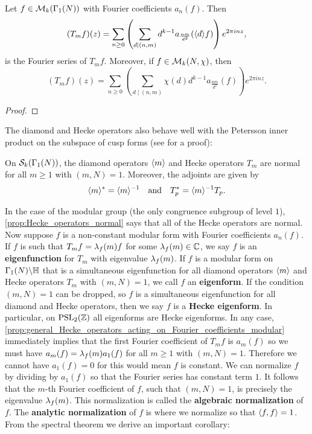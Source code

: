       \begin{proposition}\label{prop:general_Hecke_operators_acting_on_Fourier_coefficients_modular}
        Let $f \in \mathcal{M}_{k}(\Gamma_{1}(N))$ with Fourier coefficients $a_{n}(f)$. Then
        \[
          (T_{m}f)(z) = \sum_{n \ge 0}\left(\sum_{d \mid (n,m)}d^{k-1}a_{\frac{nm}{d^{2}}}(\langle d\rangle f)\right)e^{2\pi inz},
        \]
        is the Fourier series of $T_{m}f$. Moreover, if $f \in \mathcal{M}_{k}(N,\chi)$, then
        \[
          (T_{m}f)(z) = \sum_{n \ge 0}\left(\sum_{d \mid (n,m)}\chi(d)d^{k-1}a_{\frac{nm}{d^{2}}}(f)\right)e^{2\pi inz}.
        \]
      \end{proposition}
      \begin{proof}
      \end{proof}

      The diamond and Hecke operators also behave well with the Petersson inner product on the subspace of cusp forms (see \cite{lang1987introduction} for a proof):

      \begin{proposition}\label{prop:Hecke_operators_normal}
        On $\mathcal{S}_{k}(\Gamma_{1}(N))$, the diamond operators $\langle m\rangle$ and Hecke operators $T_{m}$ are normal for all $m \ge 1$ with $(m,N) = 1$. Moreover, the adjoints are given by
        \[
          \langle m\rangle^{\ast} = \langle m\rangle^{-1} \quad \text{and} \quad T_{p}^{\ast} = \langle m\rangle^{-1}T_{p}.
        \]
      \end{proposition}

      In the case of the modular group (the only congruence subgroup of level $1$), \cref{prop:Hecke_operators_normal} says that all of the Hecke operators are normal. Now suppose $f$ is a non-constant modular form with Fourier coefficients $a_{n}(f)$. If $f$ is such that $T_{m}f = \lambda_{f}(m)f$ for some $\lambda_{f}(m) \in \mathbb{C}$, we say $f$ is an \textbf{eigenfunction} for $T_{m}$ with eigenvalue $\lambda_{f}(m)$. If $f$ is a modular form on $\Gamma_{1}(N)\backslash\mathbb{H}$ that is a simultaneous eigenfunction for all diamond operators $\langle m\rangle$ and Hecke operators $T_{m}$ with $(m,N) = 1$, we call $f$ an \textbf{eigenform}. If the condition $(m,N) = 1$ can be dropped, so $f$ is a simultaneous eigenfunction for all diamond and Hecke operators, then we say $f$ is a \textbf{Hecke eigenform}. In particular, on $\mathrm{PSL}_{2}(\mathbb{Z})$ all eigenforms are Hecke eigenforms. In any case, \cref{prop:general_Hecke_operators_acting_on_Fourier_coefficients_modular} immediately implies that the first Fourier coefficient of $T_{m}f$ is $a_{m}(f)$ so we must have $a_{m}(f) = \lambda_{f}(m)a_{1}(f)$ for all $m \ge 1$ with $(m,N) = 1$. Therefore we cannot have $a_{1}(f) = 0$ for this would mean $f$ is constant. We can normalize $f$ by dividing by $a_{1}(f)$ so that the Fourier series has constant term $1$. It follows that the $m$-th Fourier coefficient of $f$, such that $(m,N) = 1$, is precisely the eigenvalue $\lambda_{f}(m)$. This normalization is called the \textbf{algebraic normalization} of $f$. The \textbf{analytic normalization} of $f$ is where we normalize so that $\langle f,f\rangle = 1$. From the spectral theorem we derive an important corollary:

